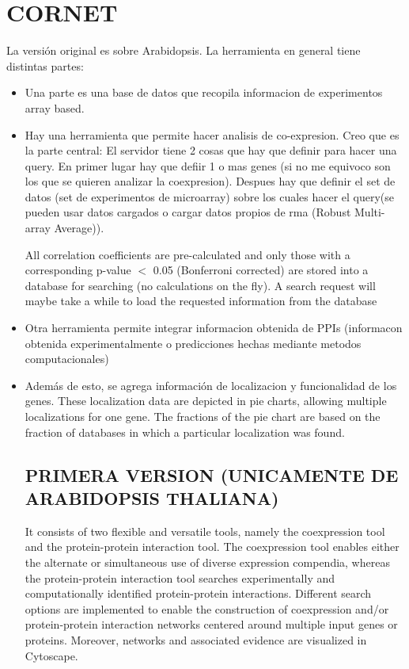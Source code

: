 \documentclass[a4paper,10pt]{article}
\begin{document}
  






\section{CORNET}
La versión original es sobre Arabidopsis. La herramienta en general tiene distintas partes:

\begin{itemize}
 \item Una parte es una base de datos que recopila informacion de experimentos array based.
 \item Hay una herramienta que permite hacer analisis de co-expresion. Creo que es la parte central: El servidor tiene 2 cosas que hay que definir para hacer una query. En primer lugar hay que defiir 1 o mas genes 
 (si no me equivoco son los que se quieren analizar la coexpresion). Despues hay que definir el set de datos (set de experimentos de microarray) sobre los cuales hacer el query(se pueden usar datos cargados o cargar datos propios de rma (Robust Multi-array Average)).  
 
  All correlation coefficients are pre-calculated and only those with a corresponding p-value $<$  0.05 (Bonferroni corrected) are stored into a database for searching (no calculations on the fly). 
  A search request will maybe take a while to load the requested information from the database
 \item Otra herramienta permite integrar informacion obtenida de PPIs (informacon obtenida experimentalmente o predicciones hechas mediante metodos computacionales)
 \item Además de esto, se agrega información de localizacion y funcionalidad de los genes. 
 These localization data are depicted in pie charts, allowing multiple localizations for one gene. The fractions of the pie chart are based on the fraction of databases in which a particular localization was found. 
 

 \subsection{PRIMERA VERSION (UNICAMENTE DE ARABIDOPSIS THALIANA)}

It consists of two flexible and versatile tools, namely the coexpression tool and the protein-protein interaction tool.
The coexpression tool enables either the alternate or simultaneous use of diverse expression compendia, whereas the protein-protein interaction tool searches
experimentally and computationally identified protein-protein interactions.
Different search options are implemented to enable the construction of coexpression and/or protein-protein interaction networks centered around multiple input genes or
proteins. Moreover, networks and associated evidence are visualized in Cytoscape.


\end{itemize}
\end{document}
